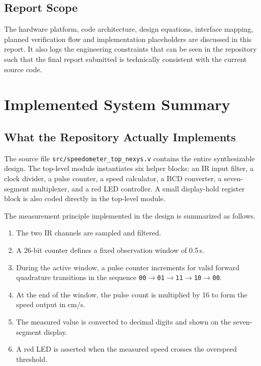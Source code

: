 \documentclass[conference,a4paper]{IEEEtran}
\begin{document}
\subsection{Report Scope}
The hardware platform, code architecture, design equations, interface mapping, planned verification flow and implementation placeholders are discussed in this report. It also logs the engineering constraints that can be seen in the repository such that the final report submitted is technically consistent with the current source code.

\section{Implemented System Summary}

\subsection{What the Repository Actually Implements}
The source file \texttt{src/speedometer\_top\_nexys.v} contains the entire synthesizable design. The top-level module instantiates six helper blocks: an IR input filter, a clock divider, a pulse counter, a speed calculator, a BCD converter, a seven-segment multiplexer, and a red LED controller. A small display-hold register block is also coded directly in the top-level module.

The measurement principle implemented in the design is summarized as follows.
\begin{enumerate}
\item The two IR channels are sampled and filtered.
\item A 26-bit counter defines a fixed observation window of 0.5\,s.
\item During the active window, a pulse counter increments for valid forward quadrature transitions in the sequence \texttt{00}$\rightarrow$\texttt{01}$\rightarrow$\texttt{11}$\rightarrow$\texttt{10}$\rightarrow$\texttt{00}.
\item At the end of the window, the pulse count is multiplied by 16 to form the speed output in cm/s.
\item The measured value is converted to decimal digits and shown on the seven-segment display.
\item A red LED is asserted when the measured speed crosses the overspeed threshold.
\end{enumerate}
\end{document}
